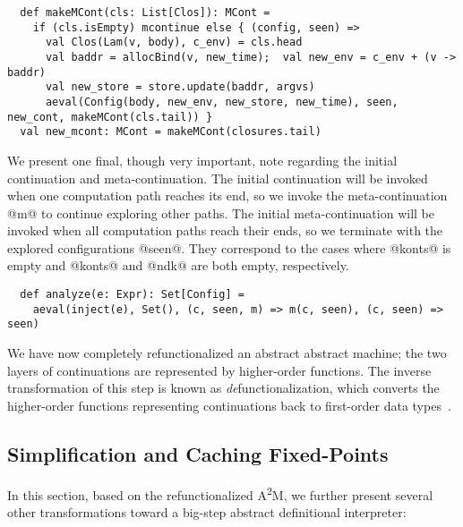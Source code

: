 \documentclass[acmsmall, screen]{acmart}\settopmatter{}
\begin{document}
\begin{lstlisting}
  def makeMCont(cls: List[Clos]): MCont =
    if (cls.isEmpty) mcontinue else { (config, seen) =>
      val Clos(Lam(v, body), c_env) = cls.head
      val baddr = allocBind(v, new_time);  val new_env = c_env + (v -> baddr)
      val new_store = store.update(baddr, argvs)
      aeval(Config(body, new_env, new_store, new_time), seen, new_cont, makeMCont(cls.tail)) }
  val new_mcont: MCont = makeMCont(closures.tail)
\end{lstlisting}

We present one final, though very important, note regarding the initial continuation and meta-continuation.
The initial continuation will be invoked when one computation path reaches its end,
so we invoke the meta-continuation @m@ to continue exploring other paths.
The initial meta-continuation will be invoked when all computation paths reach their ends,
so we terminate with the explored configurations @seen@. They correspond to the
cases where @konts@ is empty and @konts@ and @ndk@ are both empty, respectively.

\begin{lstlisting}
  def analyze(e: Expr): Set[Config] =
    aeval(inject(e), Set(), (c, seen, m) => m(c, seen), (c, seen) => seen)
\end{lstlisting}

We have now completely refunctionalized an abstract abstract machine; the two layers
of continuations are represented by higher-order functions. The inverse transformation
of this step is known as \textit{de}functionalization, which converts the higher-order functions
representing continuations back to first-order data
types~\cite{Danvy:2001:DW:773184.773202, Danvy:2008:DIP:1411204.1411206}.

\subsection{Simplification and Caching Fixed-Points}

In this section, based on the refunctionalized A\textsuperscript{2}M, we
further present several other transformations toward a big-step abstract
definitional interpreter:
\end{document}
